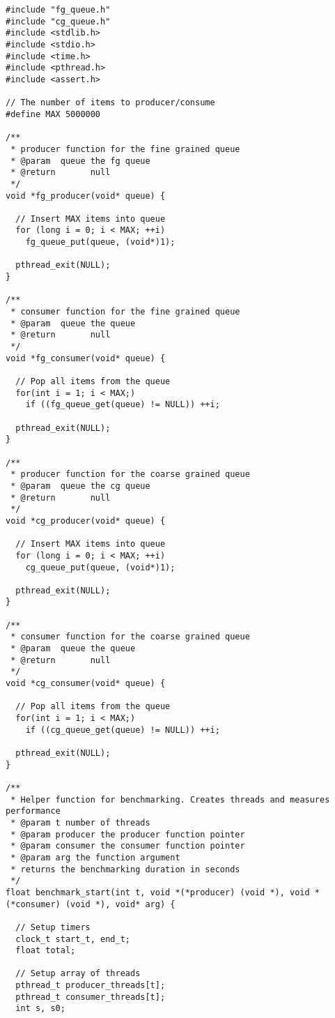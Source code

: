 \documentclass[12pt]{article}
\begin{document}
\begin{lstlisting}[caption=queue\_test.c]
#include "fg_queue.h"
#include "cg_queue.h"
#include <stdlib.h>
#include <stdio.h>
#include <time.h>
#include <pthread.h>
#include <assert.h>

// The number of items to producer/consume
#define MAX 5000000

/**
 * producer function for the fine grained queue
 * @param  queue the fg queue
 * @return       null
 */
void *fg_producer(void* queue) {

  // Insert MAX items into queue
  for (long i = 0; i < MAX; ++i)
    fg_queue_put(queue, (void*)1);

  pthread_exit(NULL);
}

/**
 * consumer function for the fine grained queue
 * @param  queue the queue
 * @return       null
 */
void *fg_consumer(void* queue) {

  // Pop all items from the queue
  for(int i = 1; i < MAX;)
    if ((fg_queue_get(queue) != NULL)) ++i;

  pthread_exit(NULL);
}

/**
 * producer function for the coarse grained queue
 * @param  queue the cg queue
 * @return       null
 */
void *cg_producer(void* queue) {

  // Insert MAX items into queue
  for (long i = 0; i < MAX; ++i)
    cg_queue_put(queue, (void*)1);

  pthread_exit(NULL);
}

/**
 * consumer function for the coarse grained queue
 * @param  queue the queue
 * @return       null
 */
void *cg_consumer(void* queue) {

  // Pop all items from the queue
  for(int i = 1; i < MAX;)
    if ((cg_queue_get(queue) != NULL)) ++i;

  pthread_exit(NULL);
}

/**
 * Helper function for benchmarking. Creates threads and measures performance
 * @param t number of threads
 * @param producer the producer function pointer
 * @param consumer the consumer function pointer
 * @param arg the function argument
 * returns the benchmarking duration in seconds
 */
float benchmark_start(int t, void *(*producer) (void *), void *(*consumer) (void *), void* arg) {

  // Setup timers
  clock_t start_t, end_t;
  float total;

  // Setup array of threads
  pthread_t producer_threads[t];
  pthread_t consumer_threads[t];
  int s, s0;


\end{lstlisting}
\end{document}
